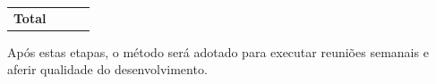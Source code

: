 \begin{table}[]
\begin{tabular}{@{}llll@{}}
            &                                             &                                             &                                             \\ \midrule
        \multicolumn{1}{|l|}{\textbf{Total}}                                                                            & \multicolumn{1}{l|}{}                       & \multicolumn{1}{l|}{}                       & \multicolumn{1}{l|}{}                       \\ \bottomrule
    \end{tabular}
\end{table}

Após estas etapas, o método será adotado para executar reuniões semanais e aferir qualidade do desenvolvimento.
